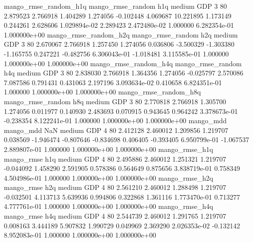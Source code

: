 mango_rmse_random_h1q mango_rmse_random                  h1q     medium      GDP                 3 80  2.879523       2.766918 1.404289       1.274056   -0.102448      4.069687     10.221895     1.173149       0.244261  2.628606 1.029894e-02     2.289423   2.472480e-02            1.000000    6.282354e-01        1.000000e+00
mango_rmse_random_h2q mango_rmse_random                  h2q     medium      GDP                 3 80  2.670067       2.766918 1.257450       1.274056    0.036806     -3.500329     -1.303380    -1.165755       0.247221 -0.482756 6.306043e-01    -1.018481   3.115585e-01            1.000000    1.000000e+00        1.000000e+00
mango_rmse_random_h4q mango_rmse_random                  h4q     medium      GDP                 3 80  2.838030       2.766918 1.364356       1.274056   -0.025797      2.570086      7.087586     0.791431       0.431063  2.197196 3.093634e-02     0.410658   6.824351e-01            1.000000    1.000000e+00        1.000000e+00
mango_rmse_random_h8q mango_rmse_random                  h8q     medium      GDP                 3 80  2.770818       2.766918 1.305700       1.274056    0.011977      0.140930      2.483693     0.070915       0.943645  0.964242 3.378673e-01    -0.238354   8.122241e-01            1.000000    1.000000e+00        1.000000e+00
            mango_mdd         mango_mdd                  NaN     medium      GDP                 4 80  2.412128       2.460012 1.209856       1.219707    0.038569     -1.946474     -0.807646    -0.834698       0.406405 -0.393405 6.950799e-01    -1.067537   2.889807e-01            1.000000    1.000000e+00        1.000000e+00
       mango_rmse_h1q        mango_rmse                  h1q     medium      GDP                 4 80  2.495886       2.460012 1.251321       1.219707   -0.044092      1.458290      2.591905     0.578386       0.564649  0.875656 3.838719e-01     0.758349   4.504986e-01            1.000000    1.000000e+00        1.000000e+00
       mango_rmse_h2q        mango_rmse                  h2q     medium      GDP                 4 80  2.561210       2.460012 1.288498       1.219707   -0.032501      4.113713      5.639936     0.994806       0.322868  1.361116 1.773470e-01     0.713277   4.777761e-01            1.000000    1.000000e+00        1.000000e+00
       mango_rmse_h4q        mango_rmse                  h4q     medium      GDP                 4 80  2.544739       2.460012 1.291765       1.219707    0.008163      3.444189      5.907832     1.990729       0.049969  2.369290 2.026353e-02    -0.132142   8.952083e-01            1.000000    1.000000e+00        1.000000e+00
